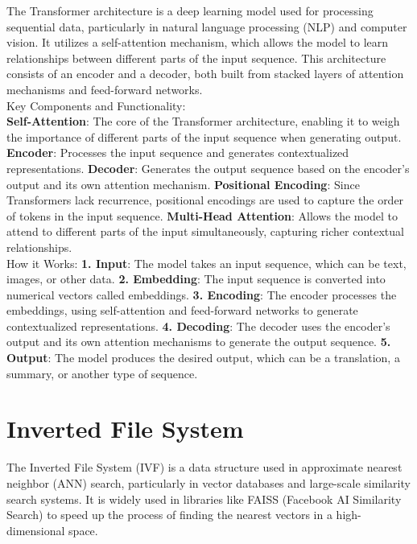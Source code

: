 \documentclass[12pt,twoside]{report}
\begin{document}
The Transformer architecture is a deep learning model used for processing sequential data, particularly in natural language processing (NLP) and computer vision. It utilizes a self-attention mechanism, which allows the model to learn relationships between different parts of the input sequence. This architecture consists of an encoder and a decoder, both built from stacked layers of attention mechanisms and feed-forward networks. \\

Key Components and Functionality: \\
\textbf{Self-Attention}:
The core of the Transformer architecture, enabling it to weigh the importance of different parts of the input sequence when generating output.
\textbf{Encoder}:
Processes the input sequence and generates contextualized representations.
\textbf{Decoder}:
Generates the output sequence based on the encoder's output and its own attention mechanism.
\textbf{Positional Encoding}:
Since Transformers lack recurrence, positional encodings are used to capture the order of tokens in the input sequence.
\textbf{Multi-Head Attention}:
Allows the model to attend to different parts of the input simultaneously, capturing richer contextual relationships. \\

How it Works:
\textbf{1. Input}:
The model takes an input sequence, which can be text, images, or other data. 
\textbf{2. Embedding}:
The input sequence is converted into numerical vectors called embeddings. 
\textbf{3. Encoding}:
The encoder processes the embeddings, using self-attention and feed-forward networks to generate contextualized representations. 
\textbf{4. Decoding}:
The decoder uses the encoder's output and its own attention mechanisms to generate the output sequence. 
\textbf{5. Output}:
The model produces the desired output, which can be a translation, a summary, or another type of sequence. 

\section{Inverted File System}
\label{appendix:invertedFileSystem}
The Inverted File System (IVF) is a data structure used in approximate nearest neighbor (ANN) search, particularly in vector databases and large-scale similarity search systems. It is widely used in libraries like FAISS (Facebook AI Similarity Search) to speed up the process of finding the nearest vectors in a high-dimensional space. \\
\end{document}
